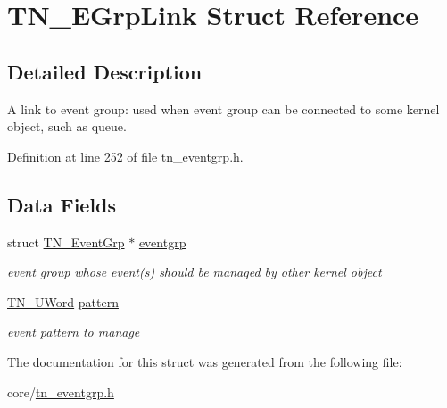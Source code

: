 \hypertarget{structTN__EGrpLink}{\section{T\+N\+\_\+\+E\+Grp\+Link Struct Reference}
\label{structTN__EGrpLink}
}


\subsection{Detailed Description}
A link to event group\+: used when event group can be connected to some kernel object, such as queue. 

Definition at line 252 of file tn\+\_\+eventgrp.\+h.

\subsection*{Data Fields}
\begin{DoxyCompactItemize}
\item 
\hypertarget{structTN__EGrpLink_a033de1028488c16a62718b2e9c8eb37f}{struct \hyperlink{structTN__EventGrp}{T\+N\+\_\+\+Event\+Grp} $\ast$ \hyperlink{structTN__EGrpLink_a033de1028488c16a62718b2e9c8eb37f}{eventgrp}}\label{structTN__EGrpLink_a033de1028488c16a62718b2e9c8eb37f}

\begin{DoxyCompactList}\small\item\em event group whose event(s) should be managed by other kernel object \end{DoxyCompactList}\item 
\hypertarget{structTN__EGrpLink_a576dde889abb0efae1f253c12a1eed64}{\hyperlink{tn__arch__example_8h_ab80cba0fe9ffcd9011d53dfeb9e39bf4}{T\+N\+\_\+\+U\+Word} \hyperlink{structTN__EGrpLink_a576dde889abb0efae1f253c12a1eed64}{pattern}}\label{structTN__EGrpLink_a576dde889abb0efae1f253c12a1eed64}

\begin{DoxyCompactList}\small\item\em event pattern to manage \end{DoxyCompactList}\end{DoxyCompactItemize}


The documentation for this struct was generated from the following file\+:\begin{DoxyCompactItemize}
\item 
core/\hyperlink{tn__eventgrp_8h}{tn\+\_\+eventgrp.\+h}\end{DoxyCompactItemize}
